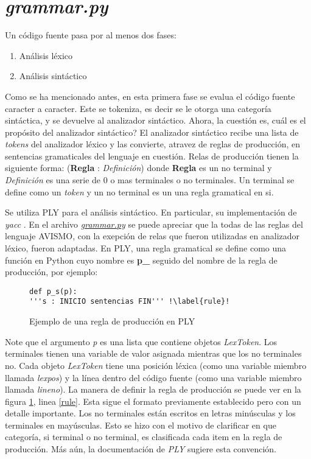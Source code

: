 \section{\textit{grammar.py}}
Un código fuente pasa por al menos dos fases:
\begin{enumerate}
	\item Análisis léxico
	\item Análisis sintáctico
\end{enumerate}

Como se ha mencionado antes, en esta primera fase se evalua el código fuente caracter a caracter.
Este se tokeniza, es decir se le otorga una categoría sintáctica, y se devuelve al analizador sintáctico.
Ahora, la cuestión es, cuál es el propósito del analizador sintáctico?
El analizador sintáctico recibe una lista de \textit{tokens} del analizador léxico y las convierte, atravez de reglas de producción, en sentencias gramaticales del lenguaje en cuestión.
Relas de producción tienen la siguiente forma: (\textbf{Regla} : \textit{Definición}) donde \textbf{Regla} es un no terminal y \textit{Definición} es una serie de 0 o mas terminales o no terminales.
Un terminal se define como un \textit{token} y un no terminal es un una regla gramatical en si.

Se utiliza PLY \cite{noauthor_ply_nodate} para el análisis sintáctico. En particular, su implementación de \textit{yacc} \cite{noauthor_man_nodate}.
En el archivo \href{https://github.com/aramis-matos/comp4999_compilers_project/blob/master/code/python_remake/grammar.py}{\textit{grammar.py}} se puede apreciar que la todas de las reglas del lenguaje AVISMO, con la exepción de relas que fueron utilizadas en analizador léxico, fueron adaptadas.
En PLY, una regla gramatical se define como una función en Python cuyo nombre es \textbf{p\_} seguido del nombre de la regla de producción, por ejemplo:
\begin{figure}[H]
	\begin{verbatim}
def p_s(p):
'''s : INICIO sentencias FIN''' !\label{rule}!
	\end{verbatim}
	\caption{Ejemplo de una regla de producción en PLY}
	\label{fig: grammarRuleExample}
\end{figure}
Note que el argumento \textit{p} es una lista que contiene objetos \textit{LexToken}.
Los terminales tienen una variable de valor asignada mientras que los no terminales no.
Cada objeto \textit{LexToken} tiene una posición léxica (como una variable miembro llamada \textit{lexpos}) y la línea dentro del código fuente  (como una variable miembro llamada \textit{lineno}).
La manera de definir la regla de producción se puede ver en la figura \ref{fig: grammarRuleExample}, linea \ref{rule}.
Esta sigue el formato previamente establecido pero con un detalle importante.
Los no terminales están escritos en letras minúsculas y los terminales en mayúsculas.
Esto se hizo con el motivo de clarificar en que categoría, si terminal o no terminal, es clasificada cada item en la regla de producción.
Más aún, la documentación de \textit{PLY} sugiere esta convención.

